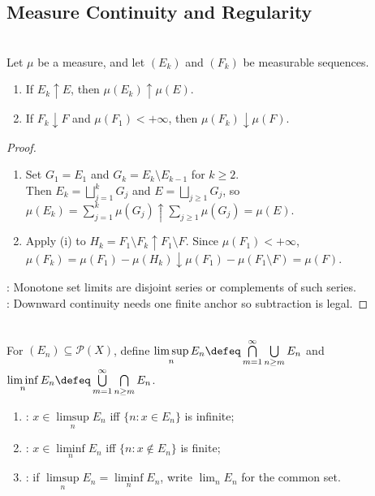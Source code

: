 \subsection{Measure Continuity and Regularity}

\begin{corollary} \label{cor:measure-continuity-up-down} \\
Let $\mu$ be a measure, and let $(E_k)$ and $(F_k)$ be measurable sequences.
\begin{enumerate}[label=(\roman*)]
\setlength{\itemsep}{0pt}
\item If $E_k\uparrow E$, then $\mu(E_k)\uparrow\mu(E)$.
\item If $F_k\downarrow F$ and $\mu(F_1)<+\infty$, then $\mu(F_k)\downarrow\mu(F)$.
\end{enumerate}
\begin{proof}
\begin{enumerate}[label=(\roman*)]
\setlength{\itemsep}{0pt}
\item Set $G_1=E_1$ and $G_k=E_k\setminus E_{k-1}$ for $k\geq2$.\\
Then $E_k=\bigsqcup_{j=1}^{k}G_j$ and $E=\bigsqcup_{j\geq1}G_j$, so $\mu(E_k)=\sum_{j=1}^{k}\mu(G_j)\uparrow\sum_{j\geq1}\mu(G_j)=\mu(E)$.
\item Apply (i) to $H_k=F_1\setminus F_k\uparrow F_1\setminus F$. Since $\mu(F_1)<+\infty$, $\mu(F_k)=\mu(F_1)-\mu(H_k)\downarrow\mu(F_1)-\mu(F_1\setminus F)=\mu(F)$.
\end{enumerate}
: Monotone set limits are disjoint series or complements of such series.\\
: Downward continuity needs one finite anchor so subtraction is legal.
\end{proof}
\end{corollary}

\begin{definition} \label{def:set-liminf-limsup} \\
For $(E_n)\subseteq\mathcal{P}(X)$, define $\limsup\limits_nE_n\defeq\bigcap\limits_{m=1}^{\infty}\bigcup\limits_{n\geq m}E_n$ and $\liminf\limits_nE_n\defeq\bigcup\limits_{m=1}^{\infty}\bigcap\limits_{n\geq m}E_n$.
\begin{enumerate}[label=(\roman*)]
\setlength{\itemsep}{0pt}
\item {}: $x\in\limsup\limits_nE_n$ iff $\{n:x\in E_n\}$ is infinite;
\item {}: $x\in\liminf\limits_nE_n$ iff $\{n:x\notin E_n\}$ is finite;
\item {}: if $\limsup\limits_nE_n=\liminf\limits_nE_n$, write $\lim_nE_n$ for the common set.
\end{enumerate}
\end{definition}

